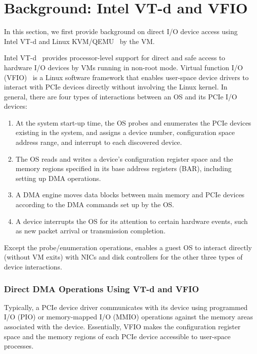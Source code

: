 
\section{Background: Intel VT-d and VFIO}
In this section, we first provide background on direct I/O
device access using Intel VT-d and Linux KVM/QEMU~\cite{kvm}
by the VM.

Intel VT-d~\cite{intelvtd-paper} provides processor-level
support for direct and safe access to hardware I/O devices by
VMs running in non-root mode.  Virtual function I/O
(VFIO)~\cite{vfio} is a Linux software framework that enables
user-space device drivers to interact with PCIe devices
directly without involving the Linux kernel.  In general,
there are four types of interactions between an OS and its
PCIe I/O devices:

\begin{enumerate}
\parskip 0mm
\itemsep 0mm
\item At the system start-up time, the OS probes and
      enumerates the PCIe devices existing in the system, and
      assigns a device number, configuration space address
      range, and interrupt to each discovered device.

\item The OS reads and writes a device's configuration
      register space and the memory regions specified in its
      base address registers (BAR), including setting up DMA
      operations.

\item A DMA engine moves data blocks between main memory and
      PCIe devices according to the DMA commands set up by the
      OS.

\item A device interrupts the OS for its attention to certain
      hardware events, such as new packet arrival or
      transmission completion.

\end{enumerate}
Except the probe/enumeration operations, \na enables a guest
OS to interact directly (without VM exits) with NICs and disk
controllers for the other three types of device interactions.

\subsubsection{Direct DMA Operations Using VT-d and VFIO}
Typically, a PCIe device driver communicates with its device using programmed I/O (PIO) or
memory-mapped I/O (MMIO) operations against the memory areas associated with the device.
Essentially, VFIO makes the configuration register space and the memory regions of
each PCIe device accessible to user-space processes.


